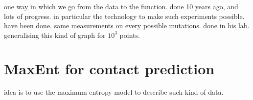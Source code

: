 one way in which we go from the data to the function.
done 10 years ago, and lots of progress. in particular the technology to make
such experiments possible. have been done. same measurements on every possible
mutations. done in his lab. generalising this kind of graph for $10^3$ points.

\section{MaxEnt for contact prediction}

idea is to use the maximum entropy model to describe such kind of data.
\TODO


